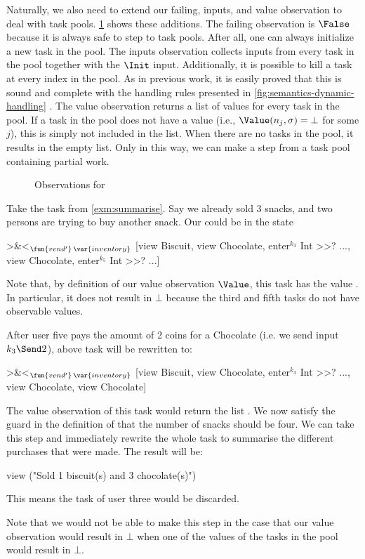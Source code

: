 Naturally, we also need to extend our failing, inputs, and value observation to deal with task pools.
\cref{fig:observations-dynamic} shows these additions.
The failing observation is $\False$ because
it is always safe to step to task pools.
After all, one can always initialize a new task in the pool.
The inputs observation collects inputs from every task in the pool
together with the $\Init$ input.
Additionally, it is possible to kill a task at every index in the pool.
As in previous work, it is easily proved that this is sound and complete with the handling rules presented in \cref{fig:semantics-dynamic-handling} \cite{Steenvoorden22}.
The value observation returns a list of values for every task in the pool.
If a task in the pool does not have a value (i.e., $\Value(n_j,\sigma) = \bot$ for some $j$),
this is simply not included in the list.
When there are no tasks in the pool, it results in the empty list.
Only in this way,
we can make a step from a task pool containing partial work.

\begin{figure}
  \caption{Observations for \DYNTOPHAT}
  \label{fig:observations-dynamic}
\end{figure}

\begin{example}
  Take the  task from \cref{exm:summarise}.
  Say we already sold 3 snacks, and two persons are trying to buy another snack.
  Our  could be in the state
  \begin{TASK}
    >&<$_{\fun{vend'}\,\var{inventory}}$ [view Biscuit, view Chocolate,
      enter$^{k_3}$ Int >>? ..., view Chocolate, enter$^{k_5}$ Int >>? ...]
  \end{TASK}
  Note that, by definition of our value observation $\Value$,
  this task has the value .
  In particular, it does not result in $\bot$ because the third and fifth tasks do not have observable values.

  After user five pays the amount of 2 coins for a Chocolate (i.e. we send input $k_3\Send2$),
  above task will be rewritten to:
  \begin{TASK}
    >&<$_{\fun{vend'}\,\var{inventory}}$ [view Biscuit, view Chocolate,
      enter$^{k_3}$ Int >>? ..., view Chocolate, view Chocolate]
  \end{TASK}
  The value observation of this task would return the list .
  We now satisfy the guard in the definition of  that the number of snacks should be four.
  We can take this step and immediately rewrite the whole task to summarise the different purchases that were made.
  The result will be:
  \begin{TASK}
    view ("Sold 1 biscuit(s) and 3 chocolate(s)")
  \end{TASK}
  This means the  task of user three would be discarded.

  Note that we would not be able to make this step in the case that our value observation would result in $\bot$ when one of the values of the tasks in the pool would result in $\bot$.
\end{example}